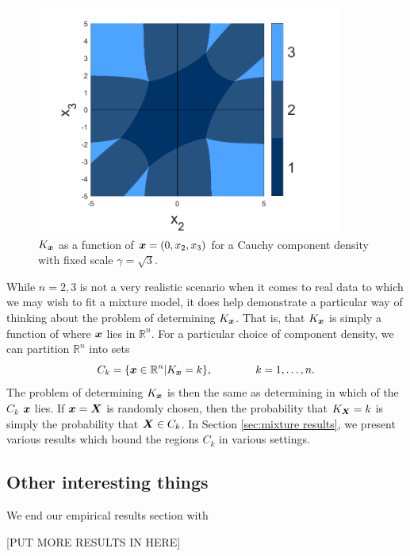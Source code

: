 	\begin{figure}
		\centering
		\includegraphics[width=0.9\textwidth]{cauchy_flag_graph.png}
		\caption{$K_{\bm{{x}}}$ as a function of ${\bm{{x}}} = (0, x_2, x_3)$ for a Cauchy component density with fixed scale $\gamma = \sqrt{3}$.}
		\label{fig:cauchy_flag_graph}
	\end{figure}
	
	While $n = 2,3$ is not a very realistic scenario when it comes to real data to which we may wish to fit a mixture model, it does help demonstrate a particular way of thinking about the problem of determining $K_{\bm{{x}}}$. That is, that $K_{\bm{{x}}}$ is simply a function of where ${\bm{{x}}}$ lies in $\mathbb{R}^n$. For a particular choice of component density, we can partition $\mathbb{R}^n$ into sets 
	\begin{equation}
		C_k = \{ {\bm{{x}}} \in \mathbb{R}^n | K_{{\bm{{x}}}} = k \}, \hspace{40pt} k = 1,\dots,n.
	\end{equation}
	The problem of determining $K_{{\bm{{x}}}}$ is then the same as determining in which of the $C_k$ ${\bm{{x}}}$ lies. If ${\bm{{x}}} = {\bm{{X}}}$ is randomly chosen, then the probability that $K_{\bm{{X}}} = k$ is simply the probability that ${\bm{{X}}} \in C_k$. In Section \ref{sec:mixture results}, we present various results which bound the regions $C_k$ in various settings.

	\subsection{Other interesting things}
	We end our empirical results section with 

	[PUT MORE RESULTS IN HERE]

